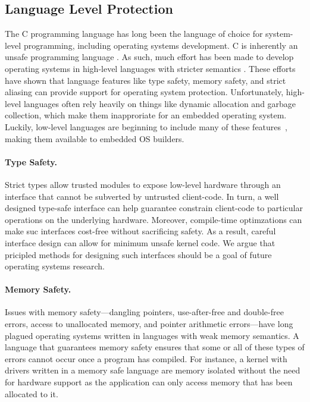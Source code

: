 \subsection{Language Level Protection}

The C programming language has long been the language of choice for system-level
programming, including operating systems development. C is inherently an unsafe
programming language \cite{kint:osdi2012, undefined:apsys2012}. As such, much
effort has been made to develop operating systems in high-level languages with
stricter semantics \cite{singularity:sigops, house:icfp2005, unikernels:2013}.
These efforts have shown that language features like type safety, memory safety,
and strict aliasing can provide support for operating system protection.
Unfortunately, high-level languages often rely heavily on things like dynamic
allocation and garbage collection, which make them inapproriate for an embedded
operating system. Luckily, low-level languages are beginning to include many of
these features~\cite{c++14,rust}, making them available to embedded OS builders.

\paragraph{Type Safety.}
Strict types allow trusted modules to expose low-level hardware through an
interface that cannot be subverted by untrusted client-code. In turn, a well
designed type-safe interface can help guarantee constrain client-code to
particular operations on the underlying hardware. Moreover, compile-time
optimzations can make suc interfaces cost-free without sacrificing safety. As a
result, careful interface design can allow for minimum unsafe kernel code. We
argue that pricipled methods for designing such interfaces should be a goal of
future operating systems research.

\paragraph{Memory Safety.}
Issues with memory safety---dangling pointers, use-after-free and
double-free errors, access to unallocated memory, and pointer arithmetic
errors---have long plagued operating systems written in
languages with weak memory semantics.
A language that guarantees memory safety ensures that some or all of
these types of errors cannot occur once a program has compiled.
For instance, a kernel with drivers written in a memory safe language are
memory isolated without the need for hardware support as the
application can only access memory that has been allocated to it.

